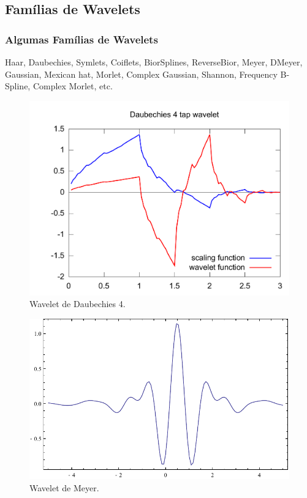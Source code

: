 \subsection{Famílias de Wavelets}

\begin{frame}[allowframebreaks]
   \frametitle{Algumas Famílias de Wavelets}
   Haar, Daubechies, Symlets, Coiflets, BiorSplines,
   ReverseBior, Meyer, DMeyer, Gaussian, Mexican hat,
   Morlet, Complex Gaussian, Shannon, Frequency B-Spline,
   Complex Morlet, etc.

   \framebreak

  \begin{figure}[hptb]
  \centering
  \includegraphics[width=.75\textwidth]{images/db4.pdf}
  \caption{Wavelet de Daubechies 4.}
  \label{fig:db4}
  \end{figure} 

  \framebreak

  \begin{figure}[hptb]
  \centering
  \includegraphics[width=.75\textwidth]{images/meyer.pdf}
  \caption{Wavelet de Meyer.}
  \label{fig:meyer}
  \end{figure} 

  \framebreak


\end{frame}
